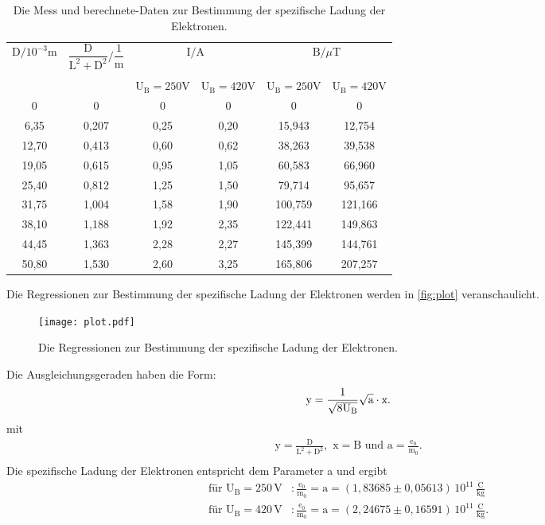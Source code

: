  \begin{table}[H]
    \centering
    \caption{Die Mess und berechnete-Daten zur Bestimmung der spezifische Ladung der Elektronen.}
    \label{tab:spe}
    \begin{tabular}{| c | c |c|  c |c|c|}
    \toprule
    $\text{D}/10^{-3}\text{m}$& $\dfrac{\text{D}}{\text{L}^2+\text{D}^2}\Big/ \dfrac{1}{\text{m}}$&\multicolumn{2}{c|}{$\text{I}/\text{A}$}& \multicolumn{2}{c|}{$\text{B}/\mu \text{T}$}\\[2ex]
    \cline{3-6}
    &&&&& \\[\dimexpr-\normalbaselineskip+2pt]
    {}&{}&$\text{U}_\text{B}=250\text{V}$&$\text{U}_\text{B}=420\text{V}$&$\text{U}_\text{B}=250\text{V}$&$\text{U}_\text{B}=420\text{V}$\\
    \midrule
 0  	&0    	&0  	&0    &  0    	&  0    \\
 6,35	&0,207	&0,25	&0,20	& 15,943	& 12,754\\
12,70	&0,413	&0,60	&0,62	& 38,263	& 39,538\\
19,05	&0,615	&0,95	&1,05	& 60,583	& 66,960\\
25,40	&0,812	&1,25	&1,50	& 79,714	& 95,657\\
31,75	&1,004	&1,58	&1,90	&100,759	&121,166\\
38,10	&1,188	&1,92	&2,35	&122,441	&149,863\\
44,45	&1,363	&2,28	&2,27	&145,399	&144,761\\
50,80	&1,530	&2,60	&3,25	&165,806	&207,257\\

    \bottomrule
 \end{tabular}
\end{table}
\noindent
Die Regressionen zur Bestimmung der spezifische Ladung der Elektronen werden in \autoref{fig:plot} veranschaulicht.
\begin{figure}[H]
  \centering
  \texttt{[image: plot.pdf]}
  \caption{Die Regressionen zur Bestimmung der spezifische Ladung der Elektronen.}
  \label{fig:plot}
\end{figure}
\noindent
Die Ausgleichungsgeraden haben die Form:
\begin{equation}
 \text{y}=\dfrac{1}{\sqrt{8\text{U}_\text{B}}}\sqrt{\text{a}}\cdot \text{x}.\\
\end{equation}
mit \begin{align*}
   \text{y}=\frac{\text{D}}{\text{L}^2+\text{D}^2},\,\, \text{x}=\text{B}  \,\,\text{und}\, \,\text{a}=\frac{\text{e}_0}{\text{m}_0}.\\
  \end{align*}
 Die spezifische Ladung der Elektronen entspricht dem Parameter a und ergibt 
 \begin{align*}
  \text{für U}_\text{B}=250 \,\text{V} &:\frac{\text{e}_0}{\text{m}_0} =\text{a}=(1,83685 \pm 0,05613)\, 10^{11}\,\mathrm{\frac{C}{kg}}\\
  \text{für U}_\text{B}=420 \,\text{V} &:\frac{\text{e}_0}{\text{m}_0}=\text{a} =(2,24675 \pm 0,16591)\,10^{11}\,\mathrm{\frac{C}{kg}}.\\
 \end{align*}



